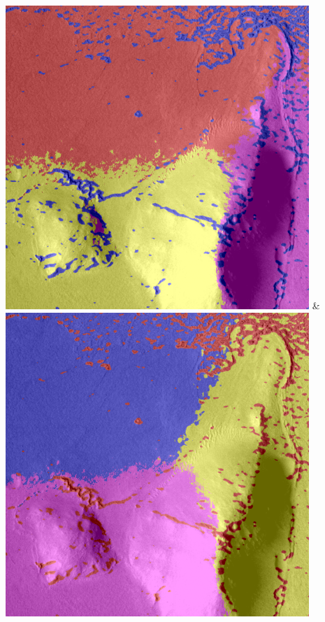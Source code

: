 \begin{table}[h!]
\begin{tabularx}{\textwidth}
		\includegraphics[width=0.9\linewidth]{images/gen/spatial_weight/p03_04.png_1.33.png} &
		\includegraphics[width=0.9\linewidth]{images/gen/spatial_weight/p03_04.png_1.66.png} \\
		\bottomrule
	\end{tabularx}
	\caption{Vergleich verschiedener Gewichtungen der Koordinaten beim Clustering der jeweiligen Eingabedateien. Die Farben der jeweilgen Cluster wurden zufällig gewählt. Alle Bilder wurden in vier Cluster eingeteilt.}
	\label{tab:filterbank_weights_pos}
\end{table}

